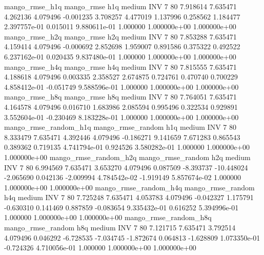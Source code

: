        mango_rmse_h1q        mango_rmse                  h1q     medium      INV                 7 80  7.918614       7.635471 4.262136       4.079496   -0.001235      3.708257      4.477019     1.137996       0.258562  1.184477 2.397757e-01     0.015011   9.880611e-01            1.000000    1.000000e+00        1.000000e+00
       mango_rmse_h2q        mango_rmse                  h2q     medium      INV                 7 80  7.853288       7.635471 4.159414       4.079496   -0.000692      2.852698      1.959007     0.891586       0.375322  0.492522 6.237162e-01     0.020435   9.837480e-01            1.000000    1.000000e+00        1.000000e+00
       mango_rmse_h4q        mango_rmse                  h4q     medium      INV                 7 80  7.815555       7.635471 4.188618       4.079496    0.003335      2.358527      2.674875     0.724761       0.470740  0.700229 4.858412e-01    -0.051749   9.588596e-01            1.000000    1.000000e+00        1.000000e+00
       mango_rmse_h8q        mango_rmse                  h8q     medium      INV                 7 80  7.764051       7.635471 4.164578       4.079496    0.016710      1.683986      2.085594     0.995496       0.322534  0.929891 3.552604e-01    -0.230469   8.183228e-01            1.000000    1.000000e+00        1.000000e+00
mango_rmse_random_h1q mango_rmse_random                  h1q     medium      INV                 7 80  8.333479       7.635471 4.392446       4.079496   -0.186271      9.141659      7.671283     0.865543       0.389362  0.719135 4.741794e-01     0.924526   3.580282e-01            1.000000    1.000000e+00        1.000000e+00
mango_rmse_random_h2q mango_rmse_random                  h2q     medium      INV                 7 80  6.994569       7.635471 3.653270       4.079496    0.087509     -8.393737    -10.448024    -2.065690       0.042136 -2.009994 4.784542e-02    -1.919149   5.857674e-02            1.000000    1.000000e+00        1.000000e+00
mango_rmse_random_h4q mango_rmse_random                  h4q     medium      INV                 7 80  7.725248       7.635471 4.053783       4.079496   -0.042327      1.175791     -0.630310     0.141469       0.887859 -0.083654 9.335432e-01     0.616252   5.394996e-01            1.000000    1.000000e+00        1.000000e+00
mango_rmse_random_h8q mango_rmse_random                  h8q     medium      INV                 7 80  7.121715       7.635471 3.792514       4.079496    0.046292     -6.728535     -7.034745    -1.872674       0.064813 -1.628809 1.073350e-01    -0.724326   4.710056e-01            1.000000    1.000000e+00        1.000000e+00
